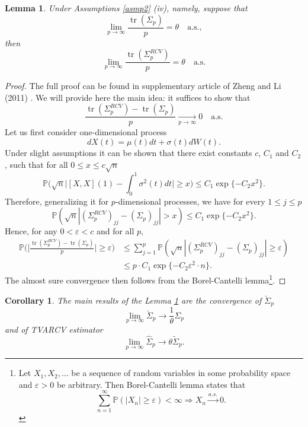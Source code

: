 \documentclass[a4paper,11pt]{book}
\theoremstyle{plain}
\newtheorem{lmm}[thm]{Lemma}
\newtheorem{crlr}[thm]{Corollary}
\theoremstyle{definition}
\newcommand{\MP}{\mathbb{P}}
\newcommand{\tr}{\operatorname{tr}}
\begin{document}
    \begin{lmm} \label{trace conv}
    	Under Assumptions \ref{asmp2} (iv), namely, suppose that
    	\[ \lim_{p \rightarrow \infty} \frac{\tr(\Sigma_p)}{p} = \theta \quad \text{a.s.}, \]
    	then
    	\[ \lim_{p \rightarrow \infty} \frac{\tr(\Sigma_p^{RCV})}{p} = \theta \quad \text{a.s.} \]
    \end{lmm}
    \begin{proof}
    	The full proof can be found in supplementary article of Zheng and Li (2011) \cite{Main}. We will provide here the main idea: it suffices to show that
    	\[ \frac{\tr(\Sigma_p^{RCV})-\tr(\Sigma_p)}{p} \xrightarrow[p \rightarrow \infty]{} 0 \quad \text{a.s.} \]
    	Let us first consider one-dimensional process
    	\[ dX(t) = \mu(t)dt + \sigma(t)dW(t). \]
    	Under slight assumptions it can be shown that there exist constants $c$, $C_1$ and $C_2$, such that for all $0 \leq x \leq c \sqrt{n}$
    	\[\MP\Big(\sqrt{n} \Big| [X, X](1) - \int_{0}^{1} \sigma^2(t)dt \Big| \geq x \Big) \leq C_1 \exp \{ -C_2 x^2 \}. \]
    	Therefore, generalizing it for $p$-dimensional processes, we have for every $1 \leq j \leq p$
    	\[ \MP(\sqrt{n} |(\Sigma_p^{RCV})_{jj} - (\Sigma_p)_{jj} | > x) \leq C_1 \exp \{ -C_2 x^2 \}. \]
    	Hence, for any $0 < \varepsilon < c$ and for all $p$,
    	\[ 
    	\begin{aligned}
    	\MP \Bigg(  \Bigg| \frac{\tr(\Sigma_p^{RCV})-\tr(\Sigma_p)}{p}  \Bigg| \geq \varepsilon \Bigg) & \leq \sum_{j=1}^{p} \MP(\sqrt{n} |(\Sigma_p^{RCV})_{jj} - (\Sigma_p)_{jj} | \geq \varepsilon) \\
    	& \leq p \cdot C_1 \exp \{ -C_2 \varepsilon^2 \cdot n  \}.
    	\end{aligned}
    	\]
    	The almost sure convergence then follows from the Borel-Cantelli lemma\footnote{
    		Let $X_1, X_2, \dots$ be a sequence of random variables in some probability space and $\varepsilon > 0$ be arbitrary.
    		Then Borel-Cantelli lemma states that
    		\[ \sum_{n=1}^{\infty} \MP(|X_n| \geq \varepsilon) < \infty \Longrightarrow X_n \xrightarrow{a.s.} 0.  \]
    	}.
    \end{proof}
    
    \begin{crlr} \label{crlr trace conv}
    	The main results of the Lemma \ref{trace conv} are the convergence of $\breve{\Sigma}_p$ 
    	\[ \lim_{p \rightarrow \infty} \breve{\Sigma}_p \rightarrow \frac{1}{\theta} \Sigma_p \]
    	and of TVARCV estimator
    	\[ \lim_{p \rightarrow \infty} \widehat{\Sigma}_p \rightarrow \theta \widetilde{\Sigma}_p. \]
    \end{crlr}
    
\end{document}
